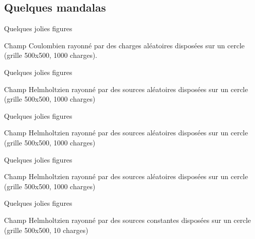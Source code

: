 \documentclass[11pt]{beamer}
\theoremstyle{plain}
\theoremstyle{definition}
\begin{document}
\subsection{Quelques mandalas}
\begin{frame}{Quelques jolies figures}
\begin{center}
Champ Coulombien rayonné par des charges aléatoires disposées sur un cercle (grille 500x500, 1000 charges). 
\begingroup
\centering
{}%
%
\endgroup
\end{center}

\end{frame}
\begin{frame}{Quelques jolies figures}
\begin{center}
Champ Helmholtzien rayonné par des sources aléatoires disposées sur un cercle (grille 500x500, 1000 charges) 
\begingroup
\centering
{}%
%
\endgroup
\end{center}

\end{frame}
\begin{frame}{Quelques jolies figures}
\begin{center}
Champ Helmholtzien rayonné par des sources aléatoires disposées sur un cercle (grille 500x500, 1000 charges)
\begingroup
\centering
{}%
%
\endgroup
\end{center}

\end{frame}
\begin{frame}{Quelques jolies figures}
\begin{center}
Champ Helmholtzien rayonné par des sources aléatoires disposées sur un cercle (grille 500x500, 1000 charges)
\begingroup
\centering
{}%
%
\endgroup
\end{center}

\end{frame}

\begin{frame}{Quelques jolies figures}
\begin{center}
Champ Helmholtzien rayonné par des sources constantes disposées sur un cercle (grille 500x500, 10 charges)
\begingroup
\centering
{}%
%
\endgroup
\end{center}

\end{frame}
\end{document}
